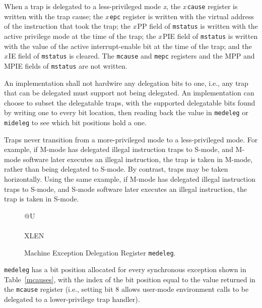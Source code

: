 When a trap is delegated to a less-privileged mode {\em x}, the
{\em x}\,{\tt cause} register is written with the trap cause; the
{\em x}\,{\tt epc} register is written with the virtual address of
the instruction that took the trap; the {\em x}\,PP field
of {\tt mstatus} is written with the active privilege mode at the time of
the trap; the {\em x}\,PIE field of {\tt mstatus} is written with the
value of the active interrupt-enable bit at the time of the trap; and
the {\em x}\,IE field of {\tt mstatus} is cleared.  The {\tt mcause} and
{\tt mepc} registers and the MPP and MPIE fields of {\tt mstatus} are
not written.

An implementation shall not hardwire any delegation bits to one, i.e.,
any trap that can be delegated must support not being delegated.  An
implementation can choose to subset the delegatable traps, with the
supported delegatable bits found by writing one to every bit location,
then reading back the value in {\tt medeleg} or {\tt mideleg} to see
which bit positions hold a one.

Traps never transition from a more-privileged mode to a less-privileged mode.
For example, if M-mode has delegated illegal instruction traps to S-mode, and
M-mode software later executes an illegal instruction, the trap is taken in
M-mode, rather than being delegated to S-mode.  By contrast, traps may be
taken horizontally.  Using the same example, if M-mode has delegated illegal
instruction traps to S-mode, and S-mode software later executes an illegal
instruction, the trap is taken in S-mode.

\begin{figure}[h!]
{\footnotesize
\begin{center}
\begin{tabular}{@{}U}
 \\
\hline
{} \\
\hline
XLEN \\
\end{tabular}
\end{center}
}
\vspace{-0.1in}
\caption{Machine Exception Delegation Register {\tt medeleg}.}
\label{medelegreg}
\end{figure}

{\tt medeleg} has a bit position allocated for every synchronous exception
shown in Table~\ref{mcauses}, with the index of the bit position equal to the
value returned in the {\tt mcause} register (i.e., setting bit 8 allows
user-mode environment calls to be delegated to a lower-privilege trap
handler).

